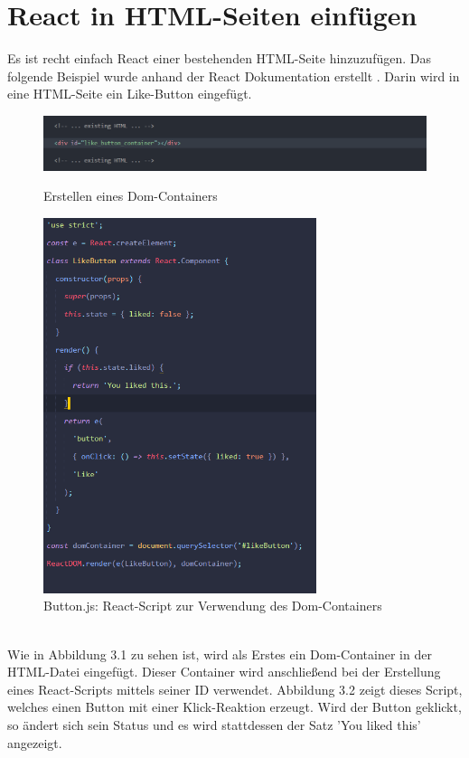 \section{React in HTML-Seiten einfügen}
Es ist recht einfach React einer bestehenden HTML-Seite hinzuzufügen. Das folgende Beispiel wurde anhand der React Dokumentation erstellt \cite{12}. Darin wird in eine HTML-Seite ein Like-Button eingefügt.\\
\begin{figure}[thb]
     \centerline{\includegraphics[width=14cm]{../Abbildungen/domContainer.png}}
  \caption{Erstellen eines Dom-Containers \cite{eig}}
  \label{fig1_1}
  \vspace{1cm}
     \centerline{\includegraphics[width=8cm]{../Abbildungen/buttonScript.png}}
  \caption{Button.js: React-Script zur Verwendung des Dom-Containers \cite{eig}}
  \label{fig1_1}
\end{figure}\\
Wie in Abbildung 3.1 zu sehen ist, wird als Erstes ein Dom-Container in der HTML-Datei eingefügt. Dieser Container wird anschließend bei der Erstellung eines React-Scripts mittels seiner ID verwendet. Abbildung 3.2 zeigt dieses Script, welches einen Button mit einer Klick-Reaktion erzeugt. Wird der Button geklickt, so ändert sich sein Status und es wird stattdessen der Satz 'You liked this' angezeigt. \\
